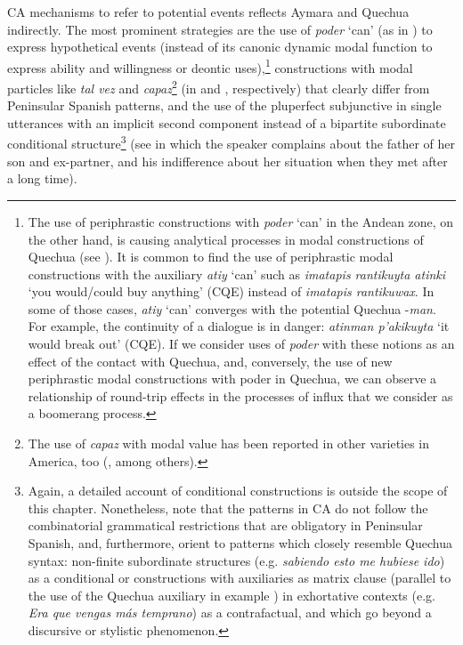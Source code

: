 \documentclass[output=paper,hidelinks]{langscibook}
\begin{document}
 CA mechanisms to refer to potential events reflects Aymara and Quechua indirectly. The most prominent strategies are the use of \textit{poder} `can' (as in ) to express hypothetical events (instead of its canonic dynamic modal function to express ability and willingness or deontic uses),\footnote{
The use of periphrastic constructions with \textit{poder} `can' in the Andean zone, on the other hand, is causing analytical processes in modal constructions of Quechua (see \citealt{Haimovich2016}). It is common to find the use of periphrastic modal constructions with the auxiliary \textit{atiy} `can' such as \textit{imatapis rantikuyta atinki} `you would/could buy anything' (CQE) instead of \textit{imatapis rantikuwax}. In some of those cases, \textit{atiy} `can' converges with the potential Quechua -\textit{man}. For example, the continuity of a dialogue is in danger: \textit{atinman p'akikuyta} `it would break out' (CQE). If we consider uses of \textit{poder} with these notions as an effect of the contact with Quechua, and, conversely, the use of new periphrastic modal constructions with poder in Quechua, we can observe a relationship of round-trip effects in the processes of influx that we consider as a boomerang process.} constructions with modal particles like \textit{tal vez} and \textit{capaz}\footnote{The use of \textit{capaz} with modal value has been reported in other varieties in America, too (\citealt{narrog2012modality, magaly2010, yelin2017capaz}, among others).} (in  and , respectively) that clearly differ from Peninsular Spanish patterns, and the use of the pluperfect subjunctive in single utterances with an implicit second component instead of a bipartite subordinate conditional structure\footnote{Again, a detailed account of conditional constructions is outside the scope of this chapter. Nonetheless, note that the patterns in CA do not follow the combinatorial grammatical restrictions that are obligatory in Peninsular Spanish, and, furthermore, orient to patterns which closely resemble Quechua syntax: non-finite subordinate structures (e.g. \textit{sabiendo esto me hubiese ido}) as a conditional or constructions with auxiliaries as matrix clause (parallel to the use of the Quechua auxiliary in example ) in exhortative contexts (e.g. \textit{Era que vengas más temprano}) as a contrafactual, and which go beyond a discursive or stylistic phenomenon.} (see  in which the speaker complains about the father of her son and ex-partner, and his indifference about her situation when they met after a long time).
\end{document}
